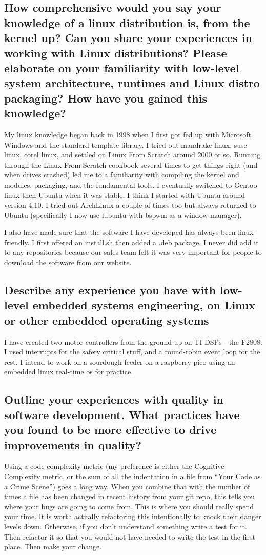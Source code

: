 \documentclass[letter,12pt]{article}
\begin{document}
\subsection{How comprehensive would you say your knowledge of a linux distribution is, from the kernel up? Can you share your experiences in working with Linux distributions? Please elaborate on your familiarity with low-level system architecture, runtimes and Linux distro packaging? How have you gained this knowledge?}
My linux knowledge began back in 1998 when I first got fed up with Microsoft Windows and the standard template library. I tried out mandrake linux, suse linux, corel linux, and settled on Linux From Scratch around 2000 or so. Running through the Linux From Scratch cookbook several times to get things right (and when drives crashed) led me to a familiarity with compiling the kernel and modules, packaging, and the fundamental tools. I eventually switched to Gentoo linux then Ubuntu when it was stable. I think I started with Ubuntu around version 4.10. I tried out ArchLinux a couple of times too but always returned to Ubuntu (specifically I now use lubuntu with bspwm as a window manager).

I also have made sure that the software I have developed has always been linux-friendly. I first offered an install.sh then added a .deb package. I never did add it to any repositories because our sales team felt it was very important for people to download the software from our website.

\subsection{Describe any experience you have with low-level embedded systems engineering, on Linux or other embedded operating systems}
I have created two motor controllers from the ground up on TI DSPs - the F2808. I used interrupts for the safety critical stuff, and a round-robin event loop for the rest. I intend to work on a sourdough feeder on a raspberry pico using an embedded linux real-time os for practice.

\subsection{Outline your experiences with quality in software development. What practices have you found to be more effective to drive improvements in quality?}
Using a code complexity metric (my preference is either the Cognitive Complexity metric, or the sum of all the indentation in a file from ``Your Code as a Crime Scene'') goes a long way. When you combine that with the number of times a file has been changed in recent history from your git repo, this tells you where your bugs are going to come from. This is where you should really spend your time. It is worth actually refactoring this intentionally to knock their danger levels down. Otherwise, if you don't understand something write a test for it. Then refactor it so that you would not have needed to write the test in the first place. Then make your change.
\end{document}
